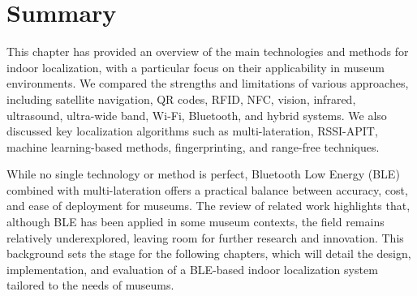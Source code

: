 \section{Summary}

This chapter has provided an overview of the main technologies and methods for indoor localization, with a particular focus on their applicability in museum environments. We compared the strengths and limitations of various approaches, including satellite navigation, QR codes, RFID, NFC, vision, infrared, ultrasound, ultra-wide band, Wi-Fi, Bluetooth, and hybrid systems. We also discussed key localization algorithms such as multi-lateration, RSSI-APIT, machine learning-based methods, fingerprinting, and range-free techniques. 

While no single technology or method is perfect, Bluetooth Low Energy (BLE) combined with multi-lateration offers a practical balance between accuracy, cost, and ease of deployment for museums. The review of related work highlights that, although BLE has been applied in some museum contexts, the field remains relatively underexplored, leaving room for further research and innovation. This background sets the stage for the following chapters, which will detail the design, implementation, and evaluation of a BLE-based indoor localization system tailored to the needs of museums.


